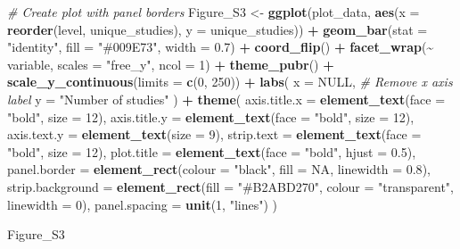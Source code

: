 \documentclass[
]{article}
\newenvironment{Shaded}{\begin{snugshade}}{\end{snugshade}}
\newcommand{\AttributeTok}[1]{\textcolor[rgb]{0.13,0.29,0.53}{#1}}
\newcommand{\CommentTok}[1]{\textcolor[rgb]{0.56,0.35,0.01}{\textit{#1}}}
\newcommand{\ConstantTok}[1]{\textcolor[rgb]{0.56,0.35,0.01}{#1}}
\newcommand{\DecValTok}[1]{\textcolor[rgb]{0.00,0.00,0.81}{#1}}
\newcommand{\FloatTok}[1]{\textcolor[rgb]{0.00,0.00,0.81}{#1}}
\newcommand{\FunctionTok}[1]{\textcolor[rgb]{0.13,0.29,0.53}{\textbf{#1}}}
\newcommand{\NormalTok}[1]{#1}
\newcommand{\OtherTok}[1]{\textcolor[rgb]{0.56,0.35,0.01}{#1}}
\newcommand{\SpecialCharTok}[1]{\textcolor[rgb]{0.81,0.36,0.00}{\textbf{#1}}}
\newcommand{\StringTok}[1]{\textcolor[rgb]{0.31,0.60,0.02}{#1}}
\begin{document}
\begin{Shaded}
\begin{Highlighting}[]
\CommentTok{\# Create plot with panel borders}
\NormalTok{Figure\_S3 }\OtherTok{\textless{}{-}} 
  \FunctionTok{ggplot}\NormalTok{(plot\_data, }\FunctionTok{aes}\NormalTok{(}\AttributeTok{x =} \FunctionTok{reorder}\NormalTok{(level, unique\_studies), }\AttributeTok{y =}\NormalTok{ unique\_studies)) }\SpecialCharTok{+}
  \FunctionTok{geom\_bar}\NormalTok{(}\AttributeTok{stat =} \StringTok{"identity"}\NormalTok{, }\AttributeTok{fill =} \StringTok{"\#009E73"}\NormalTok{, }\AttributeTok{width =} \FloatTok{0.7}\NormalTok{) }\SpecialCharTok{+}
  \FunctionTok{coord\_flip}\NormalTok{() }\SpecialCharTok{+}
  \FunctionTok{facet\_wrap}\NormalTok{(}\SpecialCharTok{\textasciitilde{}}\NormalTok{ variable, }\AttributeTok{scales =} \StringTok{"free\_y"}\NormalTok{, }\AttributeTok{ncol =} \DecValTok{1}\NormalTok{) }\SpecialCharTok{+}
  \FunctionTok{theme\_pubr}\NormalTok{() }\SpecialCharTok{+}
  \FunctionTok{scale\_y\_continuous}\NormalTok{(}\AttributeTok{limits =} \FunctionTok{c}\NormalTok{(}\DecValTok{0}\NormalTok{, }\DecValTok{250}\NormalTok{)) }\SpecialCharTok{+}
  \FunctionTok{labs}\NormalTok{(}
     \AttributeTok{x =} \ConstantTok{NULL}\NormalTok{,  }\CommentTok{\# Remove x axis label}
    \AttributeTok{y =} \StringTok{"Number of studies"}
\NormalTok{  ) }\SpecialCharTok{+}
 \FunctionTok{theme}\NormalTok{(}
    \AttributeTok{axis.title.x =} \FunctionTok{element\_text}\NormalTok{(}\AttributeTok{face =} \StringTok{"bold"}\NormalTok{, }\AttributeTok{size =} \DecValTok{12}\NormalTok{),}
    \AttributeTok{axis.title.y =} \FunctionTok{element\_text}\NormalTok{(}\AttributeTok{face =} \StringTok{"bold"}\NormalTok{, }\AttributeTok{size =} \DecValTok{12}\NormalTok{),}
    \AttributeTok{axis.text.y =} \FunctionTok{element\_text}\NormalTok{(}\AttributeTok{size =} \DecValTok{9}\NormalTok{),}
    \AttributeTok{strip.text =} \FunctionTok{element\_text}\NormalTok{(}\AttributeTok{face =} \StringTok{"bold"}\NormalTok{, }\AttributeTok{size =} \DecValTok{12}\NormalTok{),}
    \AttributeTok{plot.title =} \FunctionTok{element\_text}\NormalTok{(}\AttributeTok{face =} \StringTok{"bold"}\NormalTok{, }\AttributeTok{hjust =} \FloatTok{0.5}\NormalTok{),}
    \AttributeTok{panel.border =} \FunctionTok{element\_rect}\NormalTok{(}\AttributeTok{colour =} \StringTok{"black"}\NormalTok{, }\AttributeTok{fill =} \ConstantTok{NA}\NormalTok{, }\AttributeTok{linewidth =} \FloatTok{0.8}\NormalTok{),}
    \AttributeTok{strip.background =} \FunctionTok{element\_rect}\NormalTok{(}\AttributeTok{fill =} \StringTok{"\#B2ABD270"}\NormalTok{, }\AttributeTok{colour =} \StringTok{"transparent"}\NormalTok{, }\AttributeTok{linewidth =} \DecValTok{0}\NormalTok{),}
    \AttributeTok{panel.spacing =} \FunctionTok{unit}\NormalTok{(}\DecValTok{1}\NormalTok{, }\StringTok{"lines"}\NormalTok{)}
\NormalTok{  )}

\NormalTok{Figure\_S3}
\end{Highlighting}
\end{Shaded}
\end{document}
